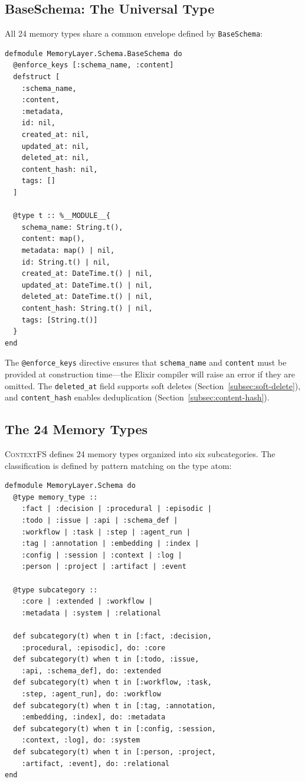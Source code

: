 \documentclass[12pt,a4paper]{article}
\theoremstyle{definition}
\newcommand{\ContextFS}{\textsc{ContextFS}}
\begin{document}
\subsection{BaseSchema: The Universal Type}\label{subsec:base-schema}

All 24 memory types share a common envelope defined by \texttt{BaseSchema}:

\begin{lstlisting}[caption={BaseSchema: the universal memory envelope.}, label={lst:base-schema}]
defmodule MemoryLayer.Schema.BaseSchema do
  @enforce_keys [:schema_name, :content]
  defstruct [
    :schema_name,
    :content,
    :metadata,
    id: nil,
    created_at: nil,
    updated_at: nil,
    deleted_at: nil,
    content_hash: nil,
    tags: []
  ]

  @type t :: %__MODULE__{
    schema_name: String.t(),
    content: map(),
    metadata: map() | nil,
    id: String.t() | nil,
    created_at: DateTime.t() | nil,
    updated_at: DateTime.t() | nil,
    deleted_at: DateTime.t() | nil,
    content_hash: String.t() | nil,
    tags: [String.t()]
  }
end
\end{lstlisting}

The \texttt{@enforce\_keys} directive ensures that \texttt{schema\_name} and \texttt{content} must be provided at construction time---the Elixir compiler will raise an error if they are omitted.
The \texttt{deleted\_at} field supports soft deletes (Section~\ref{subsec:soft-delete}), and \texttt{content\_hash} enables deduplication (Section~\ref{subsec:content-hash}).

\subsection{The 24 Memory Types}\label{subsec:24types}

\ContextFS{} defines 24 memory types organized into six subcategories.
The classification is defined by pattern matching on the type atom:

\begin{lstlisting}[caption={Subcategory classification via pattern matching.}, label={lst:subcategory}]
defmodule MemoryLayer.Schema do
  @type memory_type ::
    :fact | :decision | :procedural | :episodic |
    :todo | :issue | :api | :schema_def |
    :workflow | :task | :step | :agent_run |
    :tag | :annotation | :embedding | :index |
    :config | :session | :context | :log |
    :person | :project | :artifact | :event

  @type subcategory ::
    :core | :extended | :workflow |
    :metadata | :system | :relational

  def subcategory(t) when t in [:fact, :decision,
    :procedural, :episodic], do: :core
  def subcategory(t) when t in [:todo, :issue,
    :api, :schema_def], do: :extended
  def subcategory(t) when t in [:workflow, :task,
    :step, :agent_run], do: :workflow
  def subcategory(t) when t in [:tag, :annotation,
    :embedding, :index], do: :metadata
  def subcategory(t) when t in [:config, :session,
    :context, :log], do: :system
  def subcategory(t) when t in [:person, :project,
    :artifact, :event], do: :relational
end
\end{lstlisting}
\end{document}
